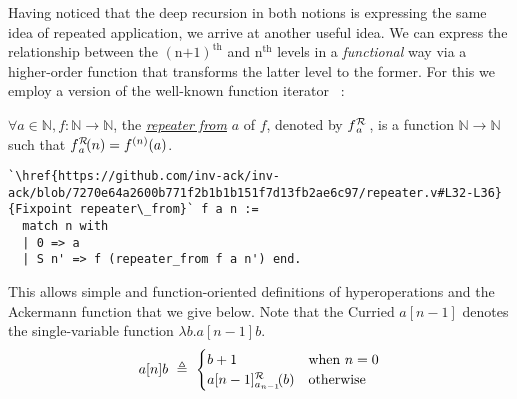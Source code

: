 Having noticed that the deep recursion in both notions is expressing the same idea
of repeated application, we arrive at another useful idea. We can express the relationship
between the $(\text{n+1})^{\text{th}}$ and $\text{n}^{\text{th}}$ levels in
a \emph{functional} way via a higher-order function that transforms the latter level
to the former. For this we employ a version of the well-known function iterator
~\cite{bertotcast}:
\begin{defn}
$\forall a\in \mathbb{N}, f: \mathbb{N}\to \mathbb{N}$, the
\href{https://github.com/inv-ack/inv-ack/blob/7270e64a2600b771f2b1b1b151f7d13fb2ae6c97/repeater.v#L32-L36}{\emph{repeater from}}
$a$ of $f$, denoted by $\rf{f}{a}$ , is a function $\mathbb{N}\to \mathbb{N}$ such that $\rf{f}{a}(n) = f^{(n)}(a)$.
\begin{lstlisting}
`\href{https://github.com/inv-ack/inv-ack/blob/7270e64a2600b771f2b1b1b151f7d13fb2ae6c97/repeater.v#L32-L36}{Fixpoint repeater\_from}` f a n :=
  match n with
  | 0 => a
  | S n' => f (repeater_from f a n') end.
\end{lstlisting}
\end{defn}
This allows simple and function-oriented definitions of hyperoperations and the
Ackermann function that we give below. Note that the Curried $a[n-1]$ denotes
the single-variable function $\lambda b.a[n-1]b$.
\vspace{-0.5em}
\begin{equation*}
a[n]b ~ \triangleq ~ \begin{cases}
b + 1 & \text{when } n = 0 \\
\rf{a[n-1]}{a_{n-1}}(b) & \text{otherwise}
\end{cases}
\end{equation*}
